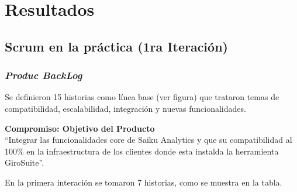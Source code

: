 \chapter{Resultados} \label{chapter:III}
\section{Scrum en la pr\'{a}ctica (1ra Iteraci\'{o}n)}
	\subsection{\textit{Produc BackLog}}
	Se definieron 15 historias como l\'{i}nea base (ver figura) que trataron temas de compatibilidad, escalabilidad, integraci\'{o}n y nuevas funcionalidades.
	
	\textbf{Compromiso: Objetivo del Producto}\\
	``Integrar las funcionalidades core de Saiku Analytics y que su compatibilidad al 100\% en la infraestructura de los clientes donde esta instalda la herramienta GiroSuite''.
	
	En la primera interaci\'{o}n se tomaron 7 historias, como se muestra en la tabla. 
	
